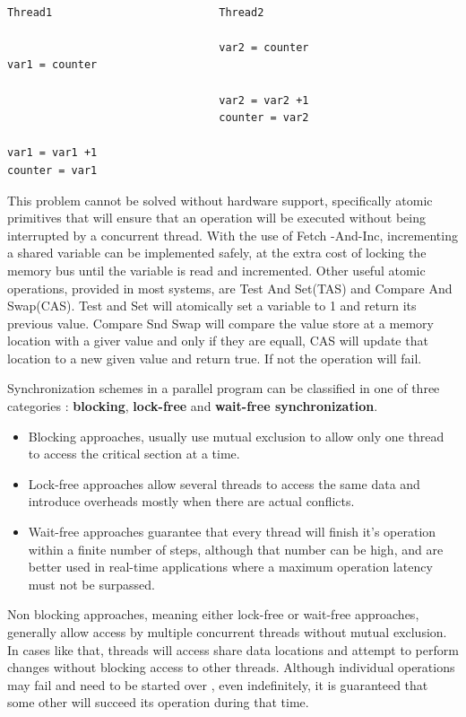 \begin{lstlisting}
	
Thread1                          Thread2

                                 var2 = counter
var1 = counter	

                                 var2 = var2 +1
                                 counter = var2

var1 = var1 +1
counter = var1

\end{lstlisting}

This problem cannot be solved without hardware support, specifically atomic primitives that will ensure that an operation will be executed without being interrupted by a concurrent thread.  With the use of Fetch -And-Inc, incrementing a shared variable can be implemented safely, at the extra cost of locking  the memory bus until the variable is read and incremented. Other useful atomic operations, provided in most systems, are Test And Set(TAS) and Compare And Swap(CAS). Test and Set will atomically set a variable to 1 and return its previous value. Compare Snd Swap will compare the value store at a memory location with a giver value and only if they are equall, CAS will update that location to a new given value and return true. If not the operation will fail.

Synchronization schemes in a parallel program  can be classified in one of three categories : \textbf{blocking}, \textbf{lock-free} and \textbf{wait-free synchronization}.

\begin{itemize}
\item Blocking approaches, usually use mutual exclusion to allow only one thread to access the critical section at a time. 

\item Lock-free approaches allow several threads to access the same data and introduce overheads mostly when there are actual conflicts. 

\item Wait-free approaches guarantee that every thread will finish it's operation within a finite number of steps, although that number can be high, and are better used in real-time applications where a maximum operation latency must not be surpassed. 
\end{itemize}

Non blocking approaches, meaning either lock-free or wait-free approaches, generally allow access by multiple concurrent threads without mutual exclusion. In cases like that, threads will access share data locations and attempt to perform changes without blocking access to other threads. Although individual operations may fail and need to be started over , even indefinitely, it is guaranteed that some other will succeed its operation during that time. %

